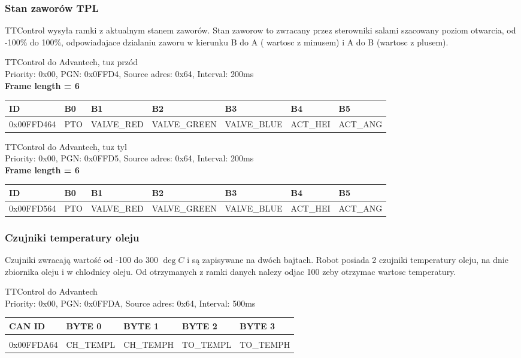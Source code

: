 \documentclass{article}
\begin{document}
\subsubsection{Stan zaworów TPL}
TTControl wysyła ramki z aktualnym stanem zaworów. Stan zaworow to zwracany przez sterowniki salami szacowany poziom otwarcia, od -100\% do 100\%, odpowiadajace dzialaniu zaworu w kierunku B do A ( wartosc z minusem) i A do B (wartosc z plusem).

TTControl do Advantech, tuz przód\\
Priority: 0x00, PGN: 0x0FFD4, Source adres: 0x64, Interval: 200ms\\
\textbf{Frame length = 6}
\begin{center}
\begin{tabular}{| p{65pt} | p{25pt} | p{70pt} | p{70pt} | p{75pt} | p{40pt} | p{40pt} |}
    \hline 
    ID & B0 & B1 & B2 & B3 & B4 & B5 \\ 
    \hline
    0x00FFD464 & PTO & VALVE\_RED & VALVE\_GREEN & VALVE\_BLUE & ACT\_HEI & ACT\_ANG \\
    \hline
\end{tabular}
\end{center}

TTControl do Advantech, tuz tyl\\
Priority: 0x00, PGN: 0x0FFD5, Source adres: 0x64, Interval: 200ms\\
\textbf{Frame length = 6}
\begin{center}
\begin{tabular}{| p{65pt} | p{30pt} | p{70pt} | p{70pt} | p{75pt} | p{40pt} | p{40pt} |}
    \hline 
    ID & B0 & B1 & B2 & B3 & B4 & B5 \\ 
    \hline
    0x00FFD564 & PTO & VALVE\_RED & VALVE\_GREEN & VALVE\_BLUE & ACT\_HEI & ACT\_ANG \\
    \hline
\end{tabular}
\end{center}

\subsubsection{Czujniki temperatury oleju}
Czujniki zwracają wartość od -100 do 300 $\deg C$ i są zapisywane na dwóch bajtach. Robot posiada 2 czujniki temperatury oleju, na dnie zbiornika oleju i w chlodnicy oleju. Od otrzymanych z ramki danych nalezy odjac 100 zeby otrzymac wartosc temperatury.

TTControl do Advantech\\
Priority: 0x00, PGN: 0x0FFDA, Source adres: 0x64, Interval: 500ms\\
\begin{left}
\begin{tabular}{ |p{2cm}|p{1.9cm}|p{1.9cm}|p{1.9cm}|p{1.9cm}|} 
 \hline
 CAN ID & BYTE 0 & BYTE 1 & BYTE 2 & BYTE 3 \\ \hline
 & & & & \\
0x00FFDA64 & CH\_TEMPL & CH\_TEMPH & TO\_TEMPL & TO\_TEMPH \\ 
 \hline
\end{tabular}
\end{left}\\
\end{document}
